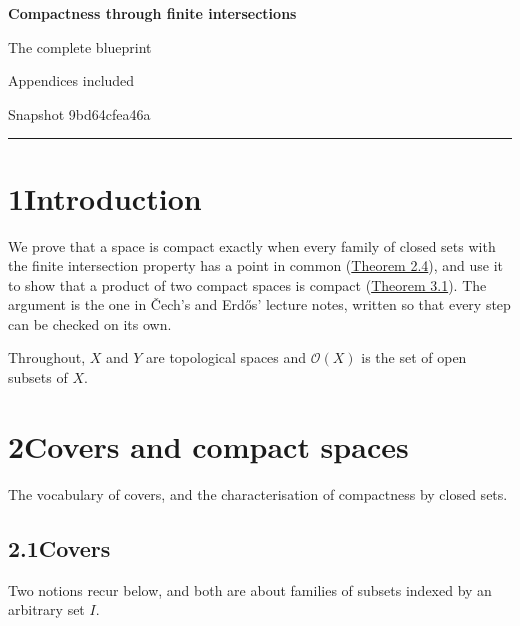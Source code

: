 \documentclass[11pt]{article}
\providecommand{\Opens}{}\renewcommand{\Opens}[1]{\mathcal{O}(#1)}
\begin{document}
\pagestyle{plain}
\begin{center}
{\LARGE\bfseries Compactness through finite intersections\par}
\vspace{0.7em}
{\large The complete blueprint\par}
\vspace{0.5em}
{\small\color{bpmuted}Appendices included\par}
{\small\color{bpmuted}Snapshot 9bd64cfea46a\par}
\end{center}
\vspace{0.5em}
{\small\tableofcontents}
\bigskip\hrule\bigskip

\section*{\texorpdfstring{1\quad Introduction}{1 Introduction}}
\label{bp1}%
We prove that a space is compact exactly when every family of closed sets with the finite intersection property has a point in common (\hyperref[bp10]{Theorem 2.4}), and use it to show that a product of two compact spaces is compact (\hyperref[bp16]{Theorem 3.1}).  The argument is the one in Čech's and Erdős' lecture notes, written so that every step can be checked on its own.

Throughout, \(X\) and \(Y\) are topological spaces and \(\Opens{X}\) is the set of open subsets of \(X\).

\section*{\texorpdfstring{2\quad Covers and compact spaces}{2 Covers and compact spaces}}
\label{bp2}%
The vocabulary of covers, and the characterisation of compactness by closed sets.
\subsection*{\texorpdfstring{2.1\quad Covers}{2.1 Covers}}
\label{bp3}%
\label{bp4}%
Two notions recur below, and both are about families of subsets indexed by an arbitrary set \(I\).
\end{document}
